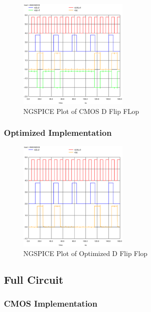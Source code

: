\documentclass[conference]{IEEEtran}
\begin{document}
\begin{figure}[H]
    \centering
    \includegraphics[width=0.48\textwidth]{images/d_ff_cmos_tran.eps}
    \caption{NGSPICE Plot of CMOS D Flip FLop}
\end{figure}

\subsubsection{Optimized Implementation}

\begin{figure}[H]
    \centering
    \includegraphics[width=0.48\textwidth]{images/d_ff_optimized_tran.eps}
    \caption{NGSPICE Plot of Optimized D Flip Flop}
\end{figure}

\subsection{Full Circuit}

\subsubsection{CMOS Implementation}
\end{document}
